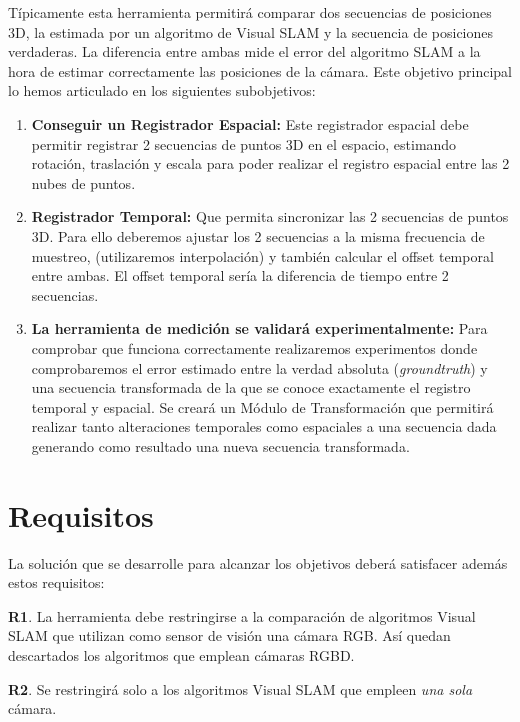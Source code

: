 Típicamente esta herramienta permitirá comparar dos secuencias de posiciones 3D, la estimada por un algoritmo de Visual SLAM y la secuencia de posiciones verdaderas. La diferencia entre ambas mide el error del algoritmo SLAM a la hora de estimar correctamente las posiciones de la cámara.
Este objetivo principal lo hemos articulado en los siguientes subobjetivos:

\begin {enumerate}
\item \textbf{Conseguir un Registrador Espacial:} Este registrador espacial debe permitir registrar 2 secuencias de puntos 3D en el espacio, estimando rotación, traslación y escala para poder realizar el registro espacial entre las 2 nubes de puntos.


\item \textbf{Registrador Temporal:} Que permita sincronizar las 2 secuencias de puntos 3D. Para ello deberemos ajustar los 2 secuencias a la misma frecuencia de muestreo, (utilizaremos interpolación) y también calcular el offset temporal entre ambas. El offset temporal sería la diferencia de tiempo entre 2 secuencias. 

\item \textbf{La herramienta de medición se validará experimentalmente:} Para comprobar que funciona correctamente realizaremos experimentos donde comprobaremos el error estimado entre la verdad absoluta (\textit{groundtruth}) y una secuencia transformada de la que se conoce exactamente el registro temporal y espacial. Se creará un Módulo de Transformación que permitirá realizar tanto alteraciones temporales como espaciales a una secuencia dada generando como resultado una nueva secuencia transformada.

\end {enumerate}

\section {Requisitos}

La solución que se desarrolle para alcanzar los objetivos deberá satisfacer además estos requisitos:


	\textbf{R1}. La herramienta debe restringirse a la comparación de algoritmos Visual SLAM que utilizan como sensor de visión una cámara RGB. Así quedan descartados los algoritmos que emplean cámaras RGBD.

	\textbf{R2}. Se restringirá solo a los algoritmos Visual SLAM que empleen \textit{una sola} cámara.

